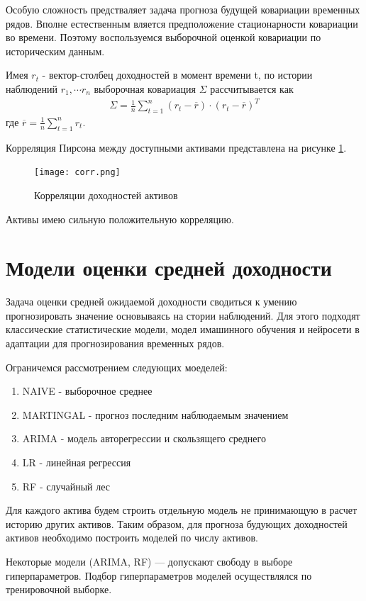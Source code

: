Особую сложность предстваляет задача прогноза будущей ковариации временных рядов. 
Вполне естественным вляется предположение стационарности ковариации во времени. 
Поэтому воспользуемся выборочной оценкой ковариации по историческим данным.

Имея $r_t$ - вектор-столбец доходностей в момент времени t, по истории наблюдений $r_1, \cdots r_n$ 
выборочная ковариация $\Sigma$ рассчитывается как 
\begin{align}
	\Sigma = \frac{1}{n} \sum_{t=1}^{n}(r_t - \overline{r}) \cdot (r_t - \overline{r})^T
\end{align}
где $\overline{r} = \frac{1}{n} \sum_{t=1}^{n} r_t$.

Корреляция Пирсона между доступными активами представлена на рисунке \ref{fig:corr}.

\begin{figure}[H]
	\centering
	\texttt{[image: corr.png]}
	\caption{Корреляции доходностей активов}
	\label{fig:corr}
\end{figure}

Активы имею сильную положительную корреляцию.

\section{Модели оценки средней доходности}

Задача оценки средней ожидаемой доходности сводиться к умению прогнозировать значение основываясь на стории наблюдений.
Для этого подходят классические статистические модели, модел имашинного обучения и нейросети в адаптации для прогнозирования 
временных рядов.

Ограничемся рассмотрением следующих моеделей:
\begin{enumerate}
	\item NAIVE - выборочное среднее
	\item MARTINGAL - прогноз последним наблюдаемым значением 
	\item ARIMA - модель авторегрессии и скользящего среднего
	\item LR - линейная регрессия
	\item RF - случайный лес
\end{enumerate}

Для каждого актива будем строить отдельную модель не принимающую в расчет историю других активов.
Таким образом, для прогноза будующих доходностей активов необходимо построить моделей по числу активов.

Некоторые модели (ARIMA, RF) --- допускают свободу в выборе гиперпараметров. 
Подбор гиперпараметров моделей осуществлялся по тренировочной выборке.

